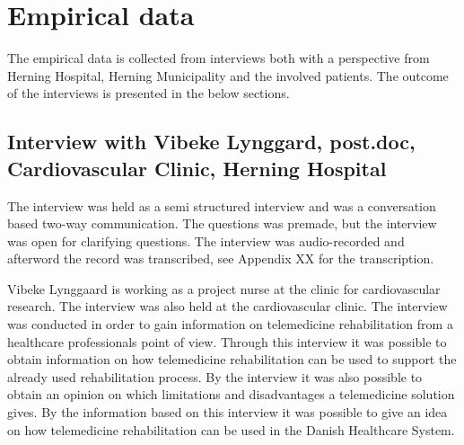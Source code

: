 \chapter{Empirical data}
\label{empirical}

The empirical data is collected from interviews both with a perspective from Herning Hospital, Herning Municipality and the involved patients. The outcome of the interviews is presented in the below sections.  

\section{Interview with Vibeke Lynggard, post.doc, Cardiovascular Clinic, Herning Hospital}
The interview was held as a semi structured interview and was a conversation based two-way communication. The questions was premade, but the interview was open for clarifying questions. The interview was audio-recorded and afterword the record was transcribed, see Appendix XX for the transcription.    

Vibeke Lynggaard is working as a project nurse at the clinic for cardiovascular research. The interview was also held at the cardiovascular clinic. The interview was conducted in order to gain information on telemedicine rehabilitation from a healthcare professionals point of view. Through this interview it was possible to obtain information on how telemedicine rehabilitation can be used to support the already used rehabilitation process. By the interview it was also possible to obtain an opinion on which limitations and disadvantages a telemedicine solution gives. By the information based on this interview it was possible to give an idea on how telemedicine rehabilitation can be used in the Danish Healthcare System. 

